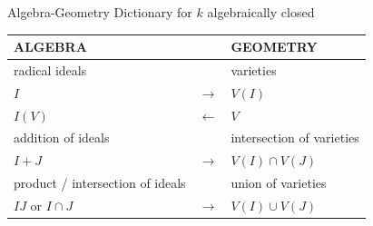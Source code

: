 \documentclass[notes=hide]{beamer}
\begin{document}
\begin{frame}{Algebra-Geometry Dictionary}
for $k$ algebraically closed
\small
\begin{center}
\begin{tabular}{>{\Centering}p{} >{\Centering}p{} >{\Centering}p{} }
\toprule
\textbf{ALGEBRA} & & \textbf{GEOMETRY}\\
\midrule
radical ideals & & varieties\\
$I$ & $\rightarrow$ & $V(I)$\\
$I(V)$ & $\leftarrow$ & $V$\pause\\
\midrule
addition of ideals & &intersection of varieties\\ 
$I+J$ & $\rightarrow$ & $V(I) \cap V(J)$\pause\\
\midrule
product / intersection of ideals & & union of varieties\\
$IJ$ or $I\cap J$ & $\rightarrow$ & $V(I)\cup V(J)$\\
\bottomrule
\end{tabular}
\end{center}
\normalsize
\end{frame}
\end{document}
